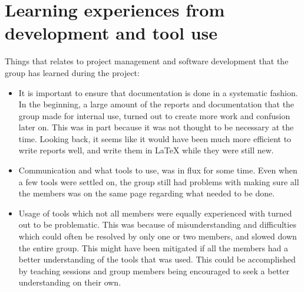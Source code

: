 \section{Learning experiences from development and tool use}
Things that relates to project management and software development that the group has learned during the project:
\begin{itemize}
 \item  It is important to ensure that documentation is done in a systematic fashion. In the beginning, a large amount of the reports and documentation that the group made for internal use, turned out to create more work and confusion later on. This was in part because it was not thought to be necessary at the time. Looking back, it seems like it would have been much more efficient to write reports well, and write them in LaTeX  while they were still new.
 \item Communication and what tools to use, was in flux for some time. Even when a few tools were settled on, the group still had problems with making sure all the members was on the same page regarding what needed to be done. 
 \item  Usage of tools which not all members were equally experienced with turned out to be problematic. This was because of misunderstanding and difficulties which could often be resolved by only one or two members, and slowed down the entire group. This might have been mitigated if all the members had a better understanding of the tools that was used. This could be accomplished by teaching sessions and group members being encouraged to seek a better understanding on their own.
 \end{itemize} 
 